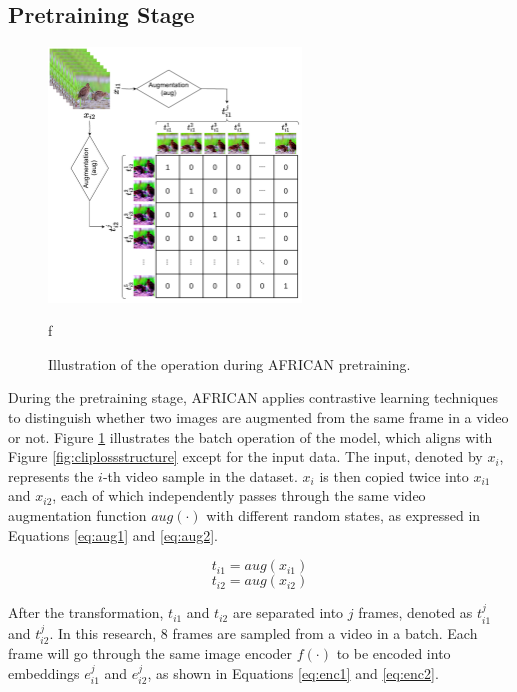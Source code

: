 \subsection{Pretraining Stage}

\begin{figure}[ht]
    \centering
    \includegraphics[width=0.6\textwidth]{assets/charts/3_3_ConstrastiveSimilarityMatrix}
    \caption[Operation of pretraining AFRICAN]{Illustration of the operation during AFRICAN pretraining.}
f\label{fig:modelstructafsim}
\end{figure}

During the pretraining stage, AFRICAN applies contrastive learning techniques to distinguish whether two images are augmented from the same frame in a video or not. Figure \ref{fig:modelstructafsim} illustrates the batch operation of the model, which aligns with Figure \ref{fig:cliplossstructure} except for the input data. The input, denoted by $x_i$, represents the $i$-th video sample in the dataset. $x_i$ is then copied twice into $x_{i1}$ and $x_{i2}$, each of which independently passes through the same video augmentation function $aug(\cdot)$ with different random states, as expressed in Equations \ref{eq:aug1} and \ref{eq:aug2}. 

\begin{equation}
    \label{eq:aug1}
    t_{i1} = aug(x_{i1})
\end{equation}
\begin{equation}
    \label{eq:aug2}
    t_{i2} = aug(x_{i2})
\end{equation}

After the transformation, $t_{i1}$ and $t_{i2}$ are separated into $j$ frames, denoted as $t_{i1}^j$ and $t_{i2}^j$. In this research, 8 frames are sampled from a video in a batch. Each frame will go through the same image encoder $f(\cdot)$ to be encoded into embeddings $e_{i1}^j$ and $e_{i2}^j$, as shown in Equations \ref{eq:enc1} and \ref{eq:enc2}.

